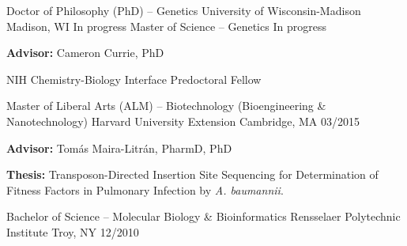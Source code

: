 

\begin{cventries}

\cventry
	{Doctor of Philosophy (PhD) -- Genetics}
	{University of Wisconsin-Madison}
	{Madison, WI}
	{In progress}
	{}
	\vspace{-0.4cm}
\cventry
	{Master of Science -- Genetics}
	{}
	{}
	{In progress}
	{
      \begin{cvitems}
      	\item {\textbf{Advisor:} Cameron Currie, PhD}
      	\item {NIH Chemistry-Biology Interface Predoctoral Fellow}
      \end{cvitems}
    }

\cventry
	{Master of Liberal Arts (ALM) -- Biotechnology (Bioengineering \& Nanotechnology)}
	{Harvard University Extension}
	{Cambridge, MA}
	{03/2015}
	{
      \begin{cvitems}
      	\item {\textbf{Advisor:} Tom\'{a}s Maira-Litr\'{a}n, PharmD, PhD}
      	\item {\textbf{Thesis:} Transposon-Directed Insertion Site Sequencing for Determination of Fitness Factors in Pulmonary Infection by \textit{A. baumannii}.}
      \end{cvitems}
    }
    
\cventry
	{Bachelor of Science -- Molecular Biology \& Bioinformatics}
	{Rensselaer Polytechnic Institute}
	{Troy, NY}
	{12/2010}
	{}
    
\end{cventries}